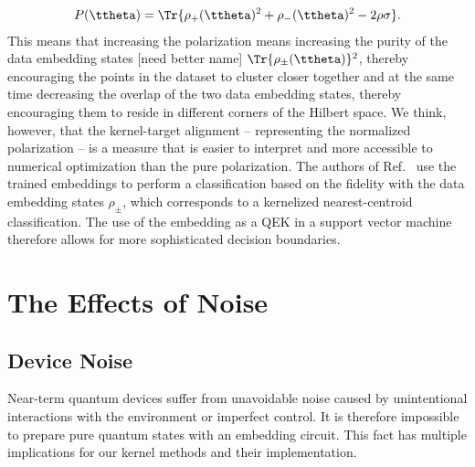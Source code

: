 \documentclass[twocolumn,superscriptaddress,nofootinbib]{revtex4-2}
\begin{document}
{        \begin{align}
            P(\ttheta) = \Tr\{\rho_{+}(\ttheta)^2 + \rho_{-}(\ttheta)^2 - 2 \rho \sigma \}.
        \end{align}
        This means that increasing the polarization means increasing the purity of the data embedding states [need better name]  $\Tr \{ \rho_{\pm}(\ttheta)\}^2$, thereby encouraging the points in the dataset to cluster closer together and at the same time decreasing the overlap of the two data embedding states, thereby encouraging them to reside in different corners of the Hilbert space.
        We think, however, that the kernel-target alignment -- representing the normalized polarization -- is a measure that is easier to interpret and more accessible to numerical optimization than the pure polarization. 
        The authors of Ref.~\cite{lloyd2020QuantumEmbeddingsML} use the trained embeddings to perform a classification based on the fidelity with the data embedding states $\rho_{\pm}$, which corresponds to a kernelized nearest-centroid classification. The use of the embedding as a \ac{QEK} in a support vector machine therefore allows for more sophisticated decision boundaries.
    }
    
\section{The Effects of Noise}
\label{sec:the_effects_of_noise}
\subsection{Device Noise}

Near-term quantum devices suffer from unavoidable noise caused by unintentional interactions with the environment or imperfect control. 
It is therefore impossible to prepare pure quantum states with an embedding circuit. 
This fact has multiple implications for our kernel methods and their implementation.
\end{document}
